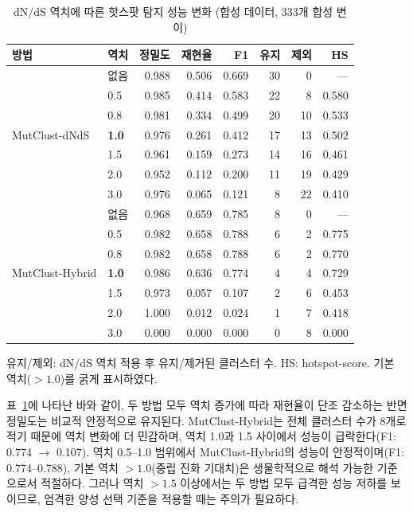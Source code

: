\begin{table}[htbp]
\centering
\caption{dN/dS 역치에 따른 핫스팟 탐지 성능 변화 (합성 데이터, 333개 합성 변이)}
\label{tab:dnds_threshold}
\small
\begin{tabular}{llrrrrrr}
\toprule
\textbf{방법} & \textbf{역치} & \textbf{정밀도} & \textbf{재현율} & \textbf{F1} & \textbf{유지} & \textbf{제외} & \textbf{HS} \\
\midrule
\multirow{7}{*}{MutClust-dNdS}
& 없음 & 0.988 & 0.506 & 0.669 & 30 & 0 & --- \\
& 0.5 & 0.985 & 0.414 & 0.583 & 22 & 8 & 0.580 \\
& 0.8 & 0.981 & 0.334 & 0.499 & 20 & 10 & 0.533 \\
& \textbf{1.0} & 0.976 & 0.261 & 0.412 & 17 & 13 & 0.502 \\
& 1.5 & 0.961 & 0.159 & 0.273 & 14 & 16 & 0.461 \\
& 2.0 & 0.952 & 0.112 & 0.200 & 11 & 19 & 0.429 \\
& 3.0 & 0.976 & 0.065 & 0.121 & 8 & 22 & 0.410 \\
\midrule
\multirow{7}{*}{MutClust-Hybrid}
& 없음 & 0.968 & 0.659 & 0.785 & 8 & 0 & --- \\
& 0.5 & 0.982 & 0.658 & 0.788 & 6 & 2 & 0.775 \\
& 0.8 & 0.982 & 0.658 & 0.788 & 6 & 2 & 0.770 \\
& \textbf{1.0} & 0.986 & 0.636 & 0.774 & 4 & 4 & 0.729 \\
& 1.5 & 0.973 & 0.057 & 0.107 & 2 & 6 & 0.453 \\
& 2.0 & 1.000 & 0.012 & 0.024 & 1 & 7 & 0.418 \\
& 3.0 & 0.000 & 0.000 & 0.000 & 0 & 8 & 0.000 \\
\bottomrule
\end{tabular}
\begin{minipage}{\textwidth}
\smallskip
\footnotesize 유지/제외: dN/dS 역치 적용 후 유지/제거된 클러스터 수. HS: hotspot-score. 기본 역치($> 1.0$)를 굵게 표시하였다.
\end{minipage}
\end{table}

표~\ref{tab:dnds_threshold}에 나타난 바와 같이, 두 방법 모두 역치 증가에 따라 재현율이 단조 감소하는 반면 정밀도는 비교적 안정적으로 유지된다.
MutClust-Hybrid는 전체 클러스터 수가 8개로 적기 때문에 역치 변화에 더 민감하며, 역치 1.0과 1.5 사이에서 성능이 급락한다(F1: 0.774 $\to$ 0.107).
역치 0.5--1.0 범위에서 MutClust-Hybrid의 성능이 안정적이며(F1: 0.774--0.788), 기본 역치 $> 1.0$(중립 진화 기대치)은 생물학적으로 해석 가능한 기준으로서 적절하다.
그러나 역치 $> 1.5$ 이상에서는 두 방법 모두 급격한 성능 저하를 보이므로, 엄격한 양성 선택 기준을 적용할 때는 주의가 필요하다.


